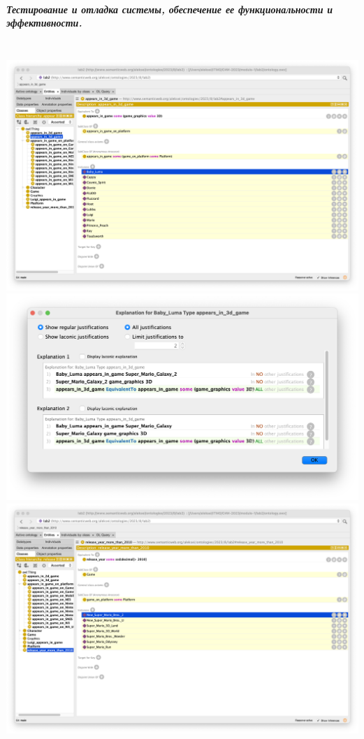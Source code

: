 \documentclass[12pt,onecolumn]{article}
\begin{document}
\subparagraph{Тестирование и отладка системы, обеспечение ее функциональности и эффективности.}\mbox{}\\
\includegraphics[width=\textwidth]{image/ontology-test-1.png}
\includegraphics[width=\textwidth]{image/ontology-test-2.png}
\includegraphics[width=\textwidth]{image/ontology-test-3.png}
\end{document}
